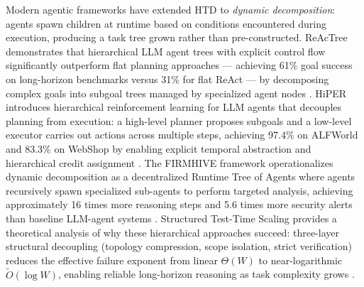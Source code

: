 Modern agentic frameworks have extended HTD to \emph{dynamic decomposition}: agents spawn children at runtime based on conditions encountered during execution, producing a task tree grown rather than pre-constructed. ReAcTree demonstrates that hierarchical LLM agent trees with explicit control flow significantly outperform flat planning approaches --- achieving 61\% goal success on long-horizon benchmarks versus 31\% for flat ReAct --- by decomposing complex goals into subgoal trees managed by specialized agent nodes \cite{reactree2025}. HiPER introduces hierarchical reinforcement learning for LLM agents that decouples planning from execution: a high-level planner proposes subgoals and a low-level executor carries out actions across multiple steps, achieving 97.4\% on ALFWorld and 83.3\% on WebShop by enabling explicit temporal abstraction and hierarchical credit assignment \cite{hiper2025}. The FIRMHIVE framework operationalizes dynamic decomposition as a decentralized Runtime Tree of Agents where agents recursively spawn specialized sub-agents to perform targeted analysis, achieving approximately 16 times more reasoning steps and 5.6 times more security alerts than baseline LLM-agent systems \cite{firmhive2025}. Structured Test-Time Scaling provides a theoretical analysis of why these hierarchical approaches succeed: three-layer structural decoupling (topology compression, scope isolation, strict verification) reduces the effective failure exponent from linear $\Theta(W)$ to near-logarithmic $\tilde{O}(\log W)$, enabling reliable long-horizon reasoning as task complexity grows \cite{structuredttt2026}.


